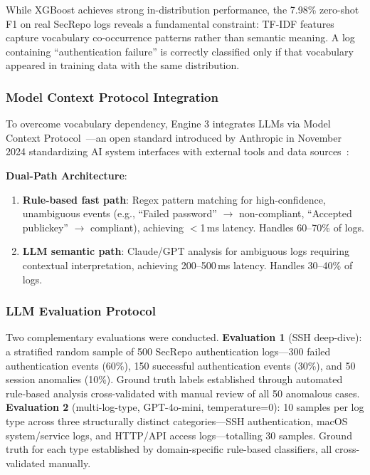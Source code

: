 \documentclass[futureinternet,article,submit,pdftex,moreauthors]{Definitions/mdpi}
\begin{document}
While XGBoost achieves strong in-distribution performance, the 7.98\% zero-shot F1 on real
SecRepo logs reveals a fundamental constraint: TF-IDF features capture vocabulary co-occurrence
patterns rather than semantic meaning. A log containing ``authentication failure'' is correctly
classified only if that vocabulary appeared in training data with the same distribution.

\subsubsection{Model Context Protocol Integration}

To overcome vocabulary dependency, Engine 3 integrates LLMs via Model Context
Protocol~\cite{mcp_anthropic,mcp_spec}---an open standard introduced by Anthropic in November
2024 standardizing AI system interfaces with external tools and data
sources~\cite{mcp_landscape}:

\textbf{Dual-Path Architecture}:
\begin{enumerate}
\item \textbf{Rule-based fast path}: Regex pattern matching for high-confidence, unambiguous
events (e.g., ``Failed password'' $\rightarrow$ non-compliant, ``Accepted publickey''
$\rightarrow$ compliant), achieving ${<}$1\,ms latency. Handles 60--70\% of logs.
\item \textbf{LLM semantic path}: Claude/GPT analysis for ambiguous logs requiring contextual
interpretation, achieving 200--500\,ms latency. Handles 30--40\% of logs.
\end{enumerate}

\subsubsection{LLM Evaluation Protocol}

Two complementary evaluations were conducted. \textbf{Evaluation 1} (SSH deep-dive): a
stratified random sample of 500 SecRepo authentication logs---300 failed authentication events
(60\%), 150 successful authentication events (30\%), and 50 session anomalies (10\%). Ground
truth labels established through automated rule-based analysis cross-validated with manual
review of all 50 anomalous cases. \textbf{Evaluation 2} (multi-log-type, GPT-4o-mini,
temperature=0): 10 samples per log type across three structurally distinct categories---SSH
authentication, macOS system/service logs, and HTTP/API access logs---totalling 30 samples.
Ground truth for each type established by domain-specific rule-based classifiers, all
cross-validated manually.
\end{document}
